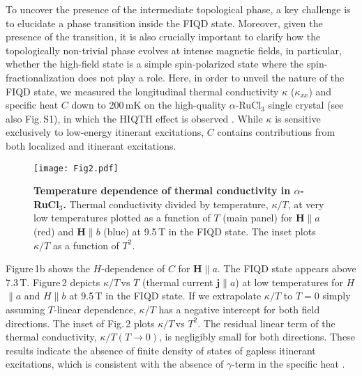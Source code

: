 \documentclass[twocolumn,preprintnumbers,prl,superscriptaddress,amsmath,amssymb,amsfonts]{revtex4}
\begin{document}
To uncover the presence of the intermediate topological phase, a key challenge is to elucidate a phase transition inside the FIQD state. Moreover, given the presence of the transition, it is also crucially important to clarify how the topologically non-trivial phase evolves at intense magnetic fields, in particular, whether the high-field state is a simple spin-polarized state where the spin-fractionalization does not play a role.  Here, in order to unveil the nature of the FIQD state, we measured the longitudinal thermal conductivity $\kappa$ ($\kappa_{xx}$) and specific heat $C$ down to 200\,mK on the high-quality $\alpha$-RuCl$_3$ single crystal (see also Fig.\,S1), in which the HIQTH effect is observed \cite{yokoi2021half}. While $\kappa$ is sensitive exclusively to low-energy itinerant excitations, $C$ contains contributions from both localized and itinerant excitations.

\begin{figure}
\texttt{[image: Fig2.pdf]}
\caption{\textbf{Temperature dependence of thermal conductivity in $\alpha$-RuCl$ _3$.}
	Thermal conductivity divided by temperature, $\kappa/T$, at very low temperatures plotted as a function of $T$ (main panel) for $\bm{H}\parallel a$ (red) and $\bm{H}\parallel b$ (blue) at 9.5\,T in the FIQD state. The inset plots $\kappa/T$ as a function of $T^2$.
\label{fig:C}
}
\end{figure}

Figure\,1b shows the $H$-dependence of $C$ for ${\bm H} \parallel a$. The FIQD state appears above 7.3\,T. Figure\,2 depicts $\kappa/T$\,vs $T$ (thermal current $\bm{j} \parallel a$) at low temperatures for {\boldmath $H$}$\parallel a$ and {\boldmath $H$}$\parallel b$ at 9.5\,T in the FIQD state. If we extrapolate $\kappa/T$ to $T=0$ simply assuming $T$-linear dependence, $\kappa/T$ has a negative intercept for both field directions. The inset of Fig.\,2 plots $\kappa/T$\,vs $T^2$. The residual linear term of the thermal conductivity, $\kappa/T(T\rightarrow 0)$, is negligibly small for both directions. These results indicate the absence of finite density of states of gapless itinerant excitations, which is consistent with the absence of $\gamma$-term in the specific heat \cite{tanaka2020thermodynamic}.
\end{document}
